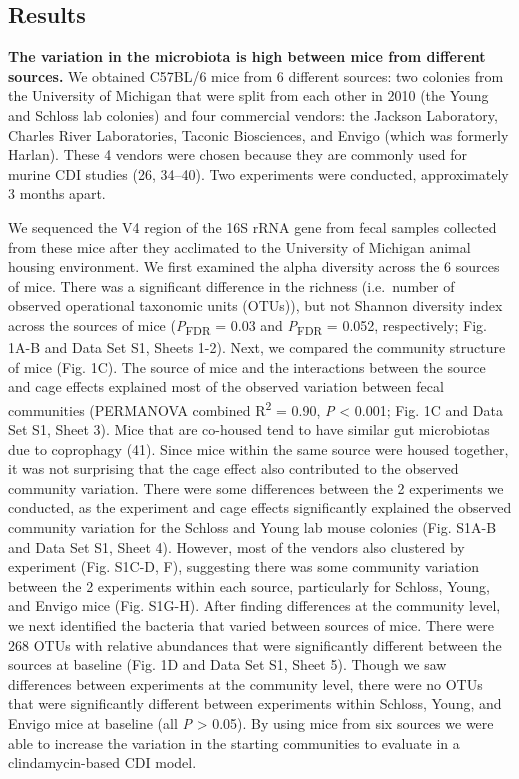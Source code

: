 \documentclass[
  11pt,
]{article}
\begin{document}
\hypertarget{results}{%
\subsection{Results}\label{results}}

\textbf{The variation in the microbiota is high between mice from
different sources.} We obtained C57BL/6 mice from 6 different sources:
two colonies from the University of Michigan that were split from each
other in 2010 (the Young and Schloss lab colonies) and four commercial
vendors: the Jackson Laboratory, Charles River Laboratories, Taconic
Biosciences, and Envigo (which was formerly Harlan). These 4 vendors
were chosen because they are commonly used for murine CDI studies (26,
34--40). Two experiments were conducted, approximately 3 months apart.

We sequenced the V4 region of the 16S rRNA gene from fecal samples
collected from these mice after they acclimated to the University of
Michigan animal housing environment. We first examined the alpha
diversity across the 6 sources of mice. There was a significant
difference in the richness (i.e.~number of observed operational
taxonomic units (OTUs)), but not Shannon diversity index across the
sources of mice (\emph{P}\textsubscript{FDR} = 0.03 and
\emph{P}\textsubscript{FDR} = 0.052, respectively; Fig. 1A-B and Data
Set S1, Sheets 1-2). Next, we compared the community structure of mice
(Fig. 1C). The source of mice and the interactions between the source
and cage effects explained most of the observed variation between fecal
communities (PERMANOVA combined R\textsuperscript{2} = 0.90, \emph{P}
\textless{} 0.001; Fig. 1C and Data Set S1, Sheet 3). Mice that are
co-housed tend to have similar gut microbiotas due to coprophagy (41).
Since mice within the same source were housed together, it was not
surprising that the cage effect also contributed to the observed
community variation. There were some differences between the 2
experiments we conducted, as the experiment and cage effects
significantly explained the observed community variation for the Schloss
and Young lab mouse colonies (Fig. S1A-B and Data Set S1, Sheet 4).
However, most of the vendors also clustered by experiment (Fig. S1C-D,
F), suggesting there was some community variation between the 2
experiments within each source, particularly for Schloss, Young, and
Envigo mice (Fig. S1G-H). After finding differences at the community
level, we next identified the bacteria that varied between sources of
mice. There were 268 OTUs with relative abundances that were
significantly different between the sources at baseline (Fig. 1D and
Data Set S1, Sheet 5). Though we saw differences between experiments at
the community level, there were no OTUs that were significantly
different between experiments within Schloss, Young, and Envigo mice at
baseline (all \emph{P} \textgreater{} 0.05). By using mice from six
sources we were able to increase the variation in the starting
communities to evaluate in a clindamycin-based CDI model.
\end{document}
